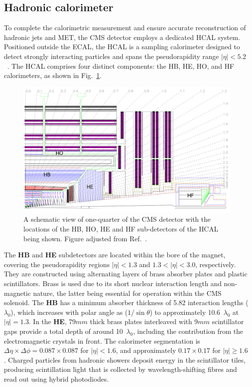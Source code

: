 \subsection{Hadronic calorimeter}
To complete the calorimetric measurement and ensure accurate reconstruction of hadronic jets and \ac{MET}, the \ac{CMS} detector employs a dedicated \ac{HCAL} system. Positioned outside the \ac{ECAL}, the \ac{HCAL} is a sampling calorimeter designed to detect strongly interacting particles and spans the pseudorapidity range $|\eta| < 5.2$~\cite{LHC_CMS,CMS_Detector_Run3}. The \ac{HCAL} comprises four distinct components: the \ac{HB}, \ac{HE}, \ac{HO}, and \ac{HF} calorimeters, as shown in Fig.~\ref{Figure:Chapter3_CMS_HCAL}.

\begin{figure}[!htbp]
\centering
\includegraphics[width= 1.0\textwidth]{Figures/Chapter3/CMS_HCAL.pdf}
\caption[Schematic of CMS detector highlighting Hadronic Calorimeter sub-detectors]{A schematic view of one-quarter of the \ac{CMS} detector with the locations of the \ac{HB}, \ac{HO}, \ac{HE} and \ac{HF} sub-detectors of the \ac{HCAL} being shown. Figure adjusted from Ref.~\cite{LHC_CMS}.}
\label{Figure:Chapter3_CMS_HCAL}
\end{figure}

The \textbf{\ac{HB}} and \textbf{\ac{HE}} subdetectors are located within the bore of the magnet, covering the pseudorapidity regions $|\eta| < 1.3$ and $1.3 < |\eta| < 3.0$, respectively. They are constructed using alternating layers of brass absorber plates and plastic scintillators. Brass is used due to its short nuclear interaction length and non-magnetic nature, the latter being essential for operation within the \ac{CMS} solenoid. The \textbf{\ac{HB}} has a minimum absorber thickness of 5.82 interaction lengths ($\lambda_0$), which increases with polar angle as ($1/\sin\theta$) to approximately 10.6~$\lambda_0$ at $|\eta| = 1.3$. In the \textbf{\ac{HE}}, 79$\unit{mm}$ thick brass plates interleaved with 9$\unit{mm}$ scintillator gaps provide a total depth of around 10~$\lambda_0$, including the contribution from the electromagnetic crystals in front. The calorimeter segmentation is $\Delta\eta \times \Delta\phi = 0.087 \times 0.087$ for $|\eta| < 1.6$, and approximately $0.17 \times 0.17$ for $|\eta| \geq 1.6$. Charged particles from hadronic showers deposit energy in the scintillator tiles, producing scintillation light that is collected by wavelength-shifting fibres and read out using hybrid photodiodes.


